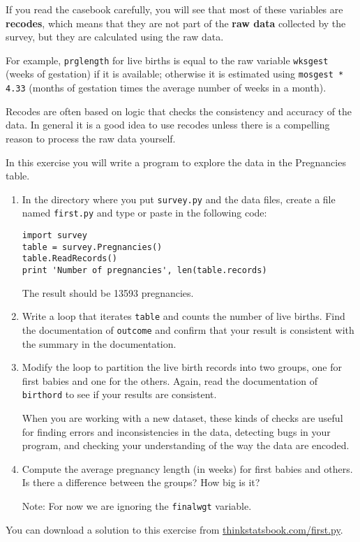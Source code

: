 \documentclass[10pt]{book}
\begin{document}
If you read the casebook carefully, you will see that most of these
variables are {\bf recodes}, which means that they are not part
of the {\bf raw data} collected by the survey, but they are
calculated using the raw data.

For example, {\tt prglength} for live births is equal to the raw
variable {\tt wksgest} (weeks of gestation) if it is available;
otherwise it is estimated using {\tt mosgest * 4.33} (months of
gestation times the average number of weeks in a month).

Recodes are often based on logic that checks the consistency and
accuracy of the data.  In general it is a good idea to use recodes
unless there is a compelling reason to process the raw data
yourself.

\begin{ex}

In this exercise you will write a program to explore the data
in the Pregnancies table.

\begin{enumerate}

\item In the directory where you put {\tt survey.py} and the
data files, create a file named \verb"first.py" and
type or paste in the following code:

\begin{verbatim}
import survey
table = survey.Pregnancies()
table.ReadRecords()
print 'Number of pregnancies', len(table.records)
\end{verbatim}

The result should be 13593 pregnancies.

\item Write a loop that iterates \verb"table" and counts
the number of live births.  Find the documentation of {\tt outcome}
and confirm that your result is consistent with the summary
in the documentation.

\item Modify the loop to partition the live birth records into
two groups, one for first babies and one for the others.  Again,
read the documentation of {\tt birthord} to see if your results
are consistent.

When you are working with a new dataset, these kinds of checks
are useful for finding errors and inconsistencies in the data,
detecting bugs in your program, and checking your understanding
of the way the data are encoded.

\item Compute the average pregnancy length (in weeks) for first
babies and others.  Is there a difference between the groups?  How
big is it?

Note: For now we are ignoring the {\tt finalwgt} variable.

\end{enumerate}

You can download a solution to this exercise from
\url{thinkstatsbook.com/first.py}.

\end{ex}
\end{document}
